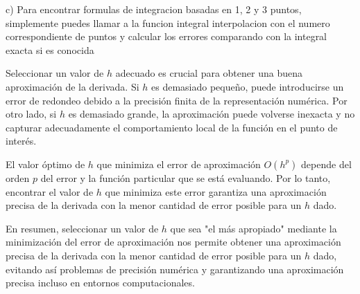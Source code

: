 \documentclass[a4paper,12pt]{article}
\begin{document}
c) Para encontrar formulas de integracion basadas en 1, 2 y 3 puntos, simplemente puedes llamar a la funcion integral interpolacion con el numero correspondiente de puntos y calcular los errores comparando con la integral exacta si es conocida

Seleccionar un valor de \( h \) adecuado es crucial para obtener una buena aproximación de la derivada. Si \( h \) es demasiado pequeño, puede introducirse un error de redondeo debido a la precisión finita de la representación numérica. Por otro lado, si \( h \) es demasiado grande, la aproximación puede volverse inexacta y no capturar adecuadamente el comportamiento local de la función en el punto de interés.

El valor óptimo de \( h \) que minimiza el error de aproximación \( O(h^p) \) depende del orden \( p \) del error y la función particular que se está evaluando. Por lo tanto, encontrar el valor de \( h \) que minimiza este error garantiza una aproximación precisa de la derivada con la menor cantidad de error posible para un \( h \) dado.

En resumen, seleccionar un valor de \( h \) que sea "el más apropiado" mediante la minimización del error de aproximación nos permite obtener una aproximación precisa de la derivada con la menor cantidad de error posible para un \( h \) dado, evitando así problemas de precisión numérica y garantizando una aproximación precisa incluso en entornos computacionales.


\end{document}
